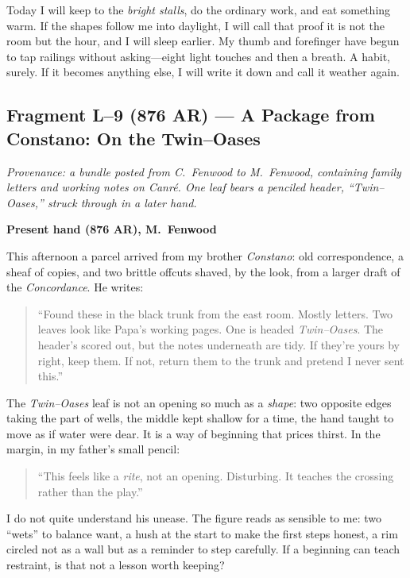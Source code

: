 \documentclass[11pt]{article}
\numberwithin{equation}{section} %
\theoremstyle{plain} %
\theoremstyle{definition} %
\theoremstyle{remark} %
\begin{document}
Today I will keep to the \emph{bright stalls}, do the ordinary work, and eat something warm. If the shapes follow me into daylight, I will call that proof it is not the room but the hour, and I will sleep earlier. My thumb and forefinger have begun to tap railings without asking—eight light touches and then a breath. A habit, surely. If it becomes anything else, I will write it down and call it weather again.

\subsection{Fragment L--9 (876 AR) — A Package from Constano: On the Twin--Oases}
\label{frag:l9}

\noindent\textit{Provenance: a bundle posted from C.\ Fenwood to M.\ Fenwood, containing family letters and working notes on \emph{Canr\'e}. One leaf bears a penciled header, “Twin--Oases,” struck through in a later hand.}

\medskip
\noindent\textbf{Present hand (876 AR), M.\ Fenwood}

This afternoon a parcel arrived from my brother \textit{Constano}: old correspondence, a sheaf of copies, and two brittle offcuts shaved, by the look, from a larger draft of the \emph{Concordance}. He writes:

\begin{quote}\small
“Found these in the black trunk from the east room. Mostly letters. Two leaves look like Papa’s working pages. One is headed \emph{Twin--Oases}. The header’s scored out, but the notes underneath are tidy. If they’re yours by right, keep them. If not, return them to the trunk and pretend I never sent this.”
\end{quote}

The \emph{Twin--Oases} leaf is not an opening so much as a \emph{shape}: two opposite edges taking the part of wells, the middle kept shallow for a time, the hand taught to move as if water were dear. It is a way of beginning that prices thirst. In the margin, in my father’s small pencil:

\begin{quote}\small
“This feels like a \emph{rite}, not an opening. Disturbing. It teaches the crossing rather than the play.”
\end{quote}

I do not quite understand his unease. The figure reads as sensible to me: two “wets” to balance want, a hush at the start to make the first steps honest, a rim circled not as a wall but as a reminder to step carefully. If a beginning can teach restraint, is that not a lesson worth keeping?
\end{document}
